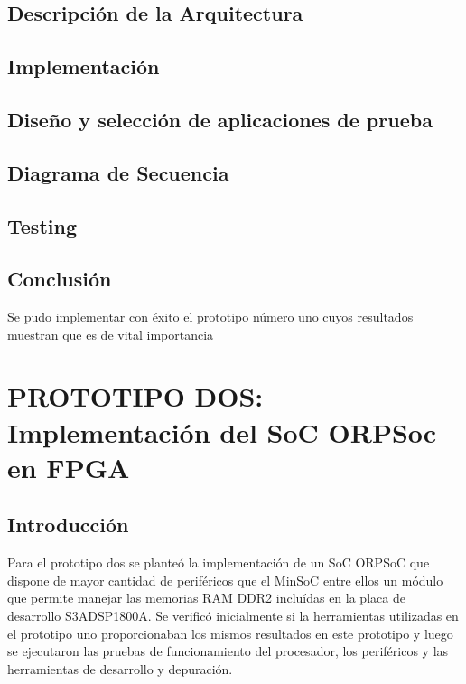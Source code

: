 		\subsection{Descripción de la Arquitectura}
		
			
		\subsection{Implementación}
		
		\subsection{Diseño y selección de aplicaciones de prueba}
		
		\subsection{Diagrama de Secuencia}
		
		\subsection{Testing}
		
		\subsection{Conclusión}
		Se pudo implementar con éxito el prototipo número uno cuyos resultados muestran que es de vital importancia 
			
	\section{PROTOTIPO DOS: Implementación del SoC ORPSoc en FPGA}
		\subsection{Introducción}
		Para el prototipo dos se planteó la implementación de un SoC ORPSoC que dispone de mayor cantidad de periféricos que el MinSoC entre ellos un módulo
		que permite manejar las memorias RAM DDR2 incluídas en la placa de desarrollo S3ADSP1800A. Se verificó inicialmente si la herramientas utilizadas en
		el prototipo uno proporcionaban los mismos resultados en este prototipo y luego se ejecutaron las pruebas de funcionamiento del procesador, los
		periféricos y las herramientas de desarrollo y depuración. 
		
